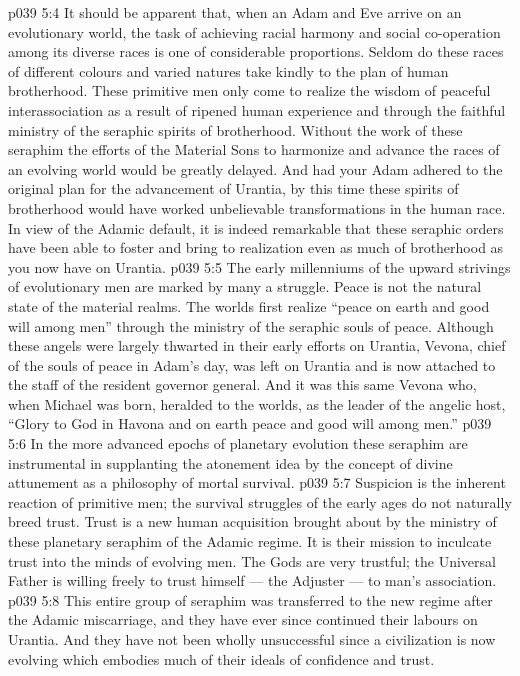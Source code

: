 \vs p039 5:4 \bibnobreakspace {} It should be apparent that, when an Adam and Eve arrive on an evolutionary world, the task of achieving racial harmony and social co\hyp{}operation among its diverse races is one of considerable proportions. Seldom do these races of different colours and varied natures take kindly to the plan of human brotherhood. These primitive men only come to realize the wisdom of peaceful interassociation as a result of ripened human experience and through the faithful ministry of the seraphic spirits of brotherhood. Without the work of these seraphim the efforts of the Material Sons to harmonize and advance the races of an evolving world would be greatly delayed. And had your Adam adhered to the original plan for the advancement of Urantia, by this time these spirits of brotherhood would have worked unbelievable transformations in the human race. In view of the Adamic default, it is indeed remarkable that these seraphic orders have been able to foster and bring to realization even as much of brotherhood as you now have on Urantia.
\vs p039 5:5 \bibnobreakspace {} The early millenniums of the upward strivings of evolutionary men are marked by many a struggle. Peace is not the natural state of the material realms. The worlds first realize “peace on earth and good will among men” through the ministry of the seraphic souls of peace. Although these angels were largely thwarted in their early efforts on Urantia, Vevona, chief of the souls of peace in Adam’s day, was left on Urantia and is now attached to the staff of the resident governor general. And it was this same Vevona who, when Michael was born, heralded to the worlds, as the leader of the angelic host, “Glory to God in Havona and on earth peace and good will among men.”
\vs p039 5:6 In the more advanced epochs of planetary evolution these seraphim are instrumental in supplanting the atonement idea by the concept of divine attunement as a philosophy of mortal survival.
\vs p039 5:7 \bibnobreakspace {} Suspicion is the inherent reaction of primitive men; the survival struggles of the early ages do not naturally breed trust. Trust is a new human acquisition brought about by the ministry of these planetary seraphim of the Adamic regime. It is their mission to inculcate trust into the minds of evolving men. The Gods are very trustful; the Universal Father is willing freely to trust himself --- the Adjuster --- to man’s association.
\vs p039 5:8 This entire group of seraphim was transferred to the new regime after the Adamic miscarriage, and they have ever since continued their labours on Urantia. And they have not been wholly unsuccessful since a civilization is now evolving which embodies much of their ideals of confidence and trust.
